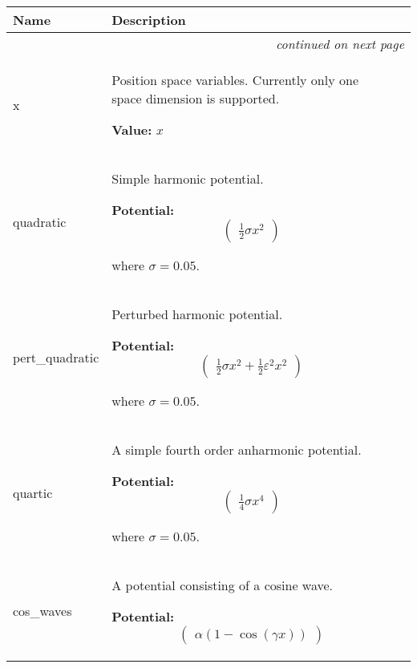     \vspace{-1cm}
\hspace{\varindent}\begin{longtable}{|p{\varnamewidth}|p{\vardescrwidth}|l}
\cline{1-2}
\cline{1-2} \centering \textbf{Name} & \centering \textbf{Description}& \\
\cline{1-2}
\endhead\cline{1-2}\multicolumn{3}{r}{\small\textit{continued on next page}}\\\endfoot\cline{1-2}
\endlastfoot\raggedright x\- & \raggedright Position space variables. Currently only one space dimension is
          supported.

\textbf{Value:}
$x$&\\
\cline{1-2}
\raggedright q\-u\-a\-d\-r\-a\-t\-i\-c\- & \raggedright Simple harmonic potential.

\textbf{Potential:}
\begin{equation}
  \begin{pmatrix}
    \frac{1}{2} \sigma x^2
  \end{pmatrix}
\end{equation}

where $\sigma = 0.05$.
&\\
\cline{1-2}
\raggedright p\-e\-r\-t\-\_\-q\-u\-a\-d\-r\-a\-t\-i\-c\- & \raggedright Perturbed harmonic potential.

\textbf{Potential:}
\begin{equation}
  \begin{pmatrix}
    \frac{1}{2} \sigma x^2 + \frac{1}{2} \varepsilon^2 x^2
  \end{pmatrix}
\end{equation}

where $\sigma = 0.05$.
&\\
\cline{1-2}
\raggedright q\-u\-a\-r\-t\-i\-c\- & \raggedright A simple fourth order anharmonic potential.

\textbf{Potential:}
\begin{equation}
  \begin{pmatrix}
    \frac{1}{4} \sigma x^4
  \end{pmatrix}
\end{equation}

where $\sigma = 0.05$.
&\\
\cline{1-2}
\raggedright c\-o\-s\-\_\-w\-a\-v\-e\-s\- & \raggedright A potential consisting of a cosine wave.

\textbf{Potential:}
\begin{equation}
  \begin{pmatrix}
    \alpha (1 - \cos(\gamma x))
  \end{pmatrix}
\end{equation}


\end{longtable}
